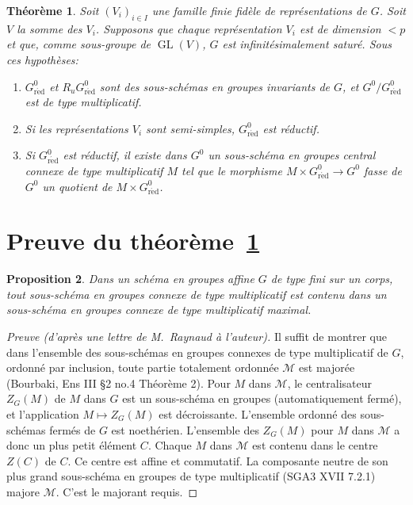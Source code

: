 \documentclass[11pt,a4paper]{article}
\theoremstyle{plain}
\newtheorem{theorem}{Th\'eor\`eme}[section]
\newtheorem{proposition}[theorem]{Proposition}
\theoremstyle{definition}
\DeclareMathOperator{\GL}{GL}
\newcommand{\red}{\mathrm{r\acute{e}d}}
\begin{document}
\begin{theorem}\label{thm:0.7}
Soit $(V_i)_{i \in I}$ une famille finie fid\`ele de repr\'esentations de $G$. Soit $V$ la somme des $V_i$. Supposons que chaque repr\'esentation $V_i$ est de dimension $< p$ et que, comme sous-groupe de $\GL(V)$, $G$ est infinit\'esimalement satur\'e. Sous ces hypoth\`eses:
\begin{enumerate}[label=(\roman*)]
\item $G^0_\red$ et $R_u G^0_\red$ sont des sous-sch\'emas en groupes invariants de $G$, et $G^0/G^0_\red$ est de type multiplicatif.
\item Si les repr\'esentations $V_i$ sont semi-simples, $G^0_\red$ est r\'eductif.
\item Si $G^0_\red$ est r\'eductif, il existe dans $G^0$ un sous-sch\'ema en groupes central connexe de type multiplicatif $M$ tel que le morphisme $M \times G^0_\red \to G^0$ fasse de $G^0$ un quotient de $M \times G^0_\red$.
\end{enumerate}
\end{theorem}

\section{Preuve du th\'eor\`eme~\ref{thm:0.7}}\label{sec:1}

\begin{proposition}\label{prop:1.1}
Dans un sch\'ema en groupes affine $G$ de type fini sur un corps, tout sous-sch\'ema en groupes connexe de type multiplicatif est contenu dans un sous-sch\'ema en groupes connexe de type multiplicatif maximal.
\end{proposition}

\begin{proof}[Preuve (d'apr\`es une lettre de M.\ Raynaud \`a l'auteur)]
Il suffit de montrer que dans l'ensemble des sous-sch\'emas en groupes connexes de type multiplicatif de $G$, ordonn\'e par inclusion, toute partie totalement ordonn\'ee $\mathcal{M}$ est major\'ee (Bourbaki, Ens III \S2 no.4 Th\'eor\`eme 2). Pour $M$ dans $\mathcal{M}$, le centralisateur $Z_G(M)$ de $M$ dans $G$ est un sous-sch\'ema en groupes (automatiquement ferm\'e), et l'application $M \mapsto Z_G(M)$ est d\'ecroissante. L'ensemble ordonn\'e des sous-sch\'emas ferm\'es de $G$ est noeth\'erien. L'ensemble des $Z_G(M)$ pour $M$ dans $\mathcal{M}$ a donc un plus petit \'el\'ement $C$. Chaque $M$ dans $\mathcal{M}$ est contenu dans le centre $Z(C)$ de $C$. Ce centre est affine et commutatif. La composante neutre de son plus grand sous-sch\'ema en groupes de type multiplicatif (SGA3 XVII 7.2.1) majore $\mathcal{M}$. C'est le majorant requis.
\end{proof}
\end{document}

